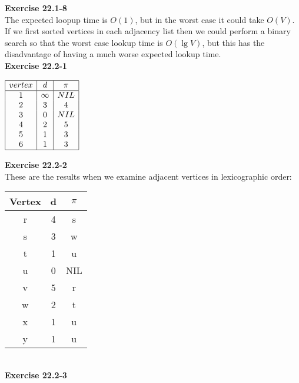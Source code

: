 \documentclass{article}
\begin{document}
\noindent\textbf{Exercise 22.1-8}\\

The expected loopup time is $O(1)$, but in the worst case it could take $O(V)$. If we first sorted vertices in each adjacency list then we could perform a binary search so that the worst case lookup time is $O(\lg V)$, but this has the disadvantage of having a much worse expected lookup time.  \\

\noindent\textbf{Exercise 22.2-1}\\

\begin{center}
$\begin{array}{|c|c|c|}
\hline
vertex& d&\pi\\
\hline
1&\infty&NIL\\
2&3&4\\
3&0&NIL\\
4&2&5\\
5&1&3\\
6&1&3\\
\hline
\end{array}
$
\end{center}

\noindent\textbf{Exercise 22.2-2}\\

These are the results when we examine adjacent vertices in lexicographic order:

\begin{tabular}{c|c|c}
Vertex & d & $\pi$ \\ \hline
r & 4 & s \\ \hline
s & 3 & w \\ \hline
t & 1 & u \\ \hline
u & 0 & NIL \\ \hline
v & 5 & r \\ \hline
w & 2 & t \\ \hline
x & 1 & u \\ \hline
y & 1 & u \\ \hline
\end{tabular}\\

\noindent\textbf{Exercise 22.2-3}\\
\end{document}
